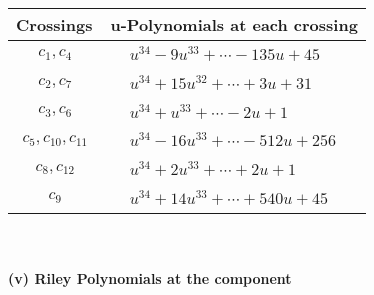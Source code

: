 \documentclass[1p]{elsarticle_modified}
\theoremstyle{definition}
\begin{document}
\begin{tabular}{m{50pt}|m{274pt}}
Crossings & \hspace{64pt}u-Polynomials at each crossing \\
\hline $$\begin{aligned}c_{1},c_{4}\end{aligned}$$&$\begin{aligned}
&u^{34}-9 u^{33}+\cdots-135 u+45
\end{aligned}$\\
\hline $$\begin{aligned}c_{2},c_{7}\end{aligned}$$&$\begin{aligned}
&u^{34}+15 u^{32}+\cdots+3 u+31
\end{aligned}$\\
\hline $$\begin{aligned}c_{3},c_{6}\end{aligned}$$&$\begin{aligned}
&u^{34}+u^{33}+\cdots-2 u+1
\end{aligned}$\\
\hline $$\begin{aligned}c_{5},c_{10},c_{11}\end{aligned}$$&$\begin{aligned}
&u^{34}-16 u^{33}+\cdots-512 u+256
\end{aligned}$\\
\hline $$\begin{aligned}c_{8},c_{12}\end{aligned}$$&$\begin{aligned}
&u^{34}+2 u^{33}+\cdots+2 u+1
\end{aligned}$\\
\hline $$\begin{aligned}c_{9}\end{aligned}$$&$\begin{aligned}
&u^{34}+14 u^{33}+\cdots+540 u+45
\end{aligned}$\\
\hline
\end{tabular}\\~\\
\newpage\renewcommand{\arraystretch}{1}
\flushleft \textbf{(v) Riley Polynomials at the component}\newline \\
\end{document}
